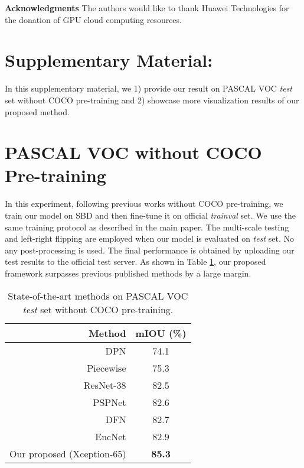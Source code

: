 \documentclass[10pt,twocolumn,letterpaper]{article}
\newcommand{\1}{{\mathbbm{1}}}
\begin{document}
{\bf Acknowledgments}
The authors would like to thank Huawei Technologies
for the donation  of GPU cloud computing resources.



{\small


}

















\section*{
Supplementary Material:
}



In this supplementary material, we 1) provide our result on PASCAL VOC \cite{everingham2010pascal} {\it test} set without COCO \cite{lin2014microsoft} pre-training and 2) showcase more visualization results of our proposed method.

\section{PASCAL VOC without COCO Pre-training}
In this experiment, following previous works \cite{wu2016wider, zhao2017pyramid, zhang2018context} without COCO pre-training, we train our model on SBD \cite{hariharan2011semantic} and then fine-tune it on official {\it trainval} set.
We use the same training protocol as described in the main paper.
The multi-scale testing and left-right flipping are employed when our model is evaluated on {\it test} set. No any post-processing is used. The final performance is obtained by uploading our test results to the official test server.
As shown in Table \ref{table:state_of_the_art_methods_wo_coco}, our proposed framework surpasses previous published methods by a large margin.

\begin{table}[!h]

\begin{center}
\small
\begin{tabular}{ r |c}
\hline
Method & mIOU (\%) \\
\hline\hline
DPN \cite{liu2015semantic} & 74.1 \\
Piecewise \cite{lin2016efficient} & 75.3 \\
ResNet-38 \cite{wu2016wider} & 82.5 \\
PSPNet \cite{zhao2017pyramid} & 82.6 \\
DFN \cite{yu2018learning} & 82.7 \\
EncNet \cite{zhang2018context} & 82.9 \\
\hline
Our proposed (Xception-65) & \textbf{85.3} \\
\hline
\end{tabular}
\end{center}
\caption{State-of-the-art methods on PASCAL VOC {\it test} set without COCO pre-training.}
\label{table:state_of_the_art_methods_wo_coco}
\end{table}
\end{document}
